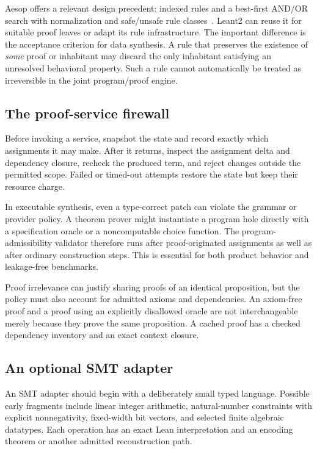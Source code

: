 \documentclass[11pt,letterpaper]{article}
\theoremstyle{definition}
\theoremstyle{remark}
\begin{document}
Aesop offers a relevant design precedent: indexed rules and a best-first AND/OR search with normalization and safe/unsafe rule classes~\cite{aesop}. Leant2 can reuse it for suitable proof leaves or adapt its rule infrastructure. The important difference is the acceptance criterion for data synthesis. A rule that preserves the existence of \emph{some} proof or inhabitant may discard the only inhabitant satisfying an unresolved behavioral property. Such a rule cannot automatically be treated as irreversible in the joint program/proof engine.

\subsection{The proof-service firewall}

Before invoking a service, snapshot the state and record exactly which assignments it may make. After it returns, inspect the assignment delta and dependency closure, recheck the produced term, and reject changes outside the permitted scope. Failed or timed-out attempts restore the state but keep their resource charge.

In executable synthesis, even a type-correct patch can violate the grammar or provider policy. A theorem prover might instantiate a program hole directly with a specification oracle or a noncomputable choice function. The program-admissibility validator therefore runs after proof-originated assignments as well as after ordinary construction steps. This is essential for both product behavior and leakage-free benchmarks.

Proof irrelevance can justify sharing proofs of an identical proposition, but the policy must also account for admitted axioms and dependencies. An axiom-free proof and a proof using an explicitly disallowed oracle are not interchangeable merely because they prove the same proposition. A cached proof has a checked dependency inventory and an exact context closure.

\subsection{An optional SMT adapter}

An SMT adapter should begin with a deliberately small typed language. Possible early fragments include linear integer arithmetic, natural-number constraints with explicit nonnegativity, fixed-width bit vectors, and selected finite algebraic datatypes. Each operation has an exact Lean interpretation and an encoding theorem or another admitted reconstruction path.
\end{document}

